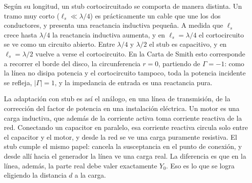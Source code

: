 Según su longitud, un stub cortocircuitado se comporta de manera distinta. Un tramo muy corto ($\ell_s\ll\lambda/4$) es prácticamente un cable que une los dos conductores, y presenta una reactancia inductiva pequeña. A medida que $\ell_s$ crece hasta $\lambda/4$ la reactancia inductiva aumenta, y en $\ell_s=\lambda/4$ el cortocircuito se ve como un circuito abierto. Entre $\lambda/4$ y $\lambda/2$ el stub es capacitivo, y en $\ell_s=\lambda/2$ vuelve a verse el cortocircuito. En la Carta de Smith esto corresponde a recorrer el borde del disco, la circunferencia $r=0$, partiendo de $\Gamma=-1$: como la línea no disipa potencia y el cortocircuito tampoco, toda la potencia incidente se refleja, $|\Gamma|=1$, y la impedancia de entrada es una reactancia pura.

La adaptación con stub es así el análogo, en una línea de transmisión, de la corrección del factor de potencia en una instalación eléctrica. Un motor es una carga inductiva, que además de la corriente activa toma corriente reactiva de la red. Conectando un capacitor en paralelo, esa corriente reactiva circula solo entre el capacitor y el motor, y desde la red se ve una carga puramente resistiva. El stub cumple el mismo papel: cancela la susceptancia en el punto de conexión, y desde allí hacia el generador la línea ve una carga real. La diferencia es que en la línea, además, la parte real debe valer exactamente $Y_0$. Eso es lo que se logra eligiendo la distancia $d$ a la carga.

